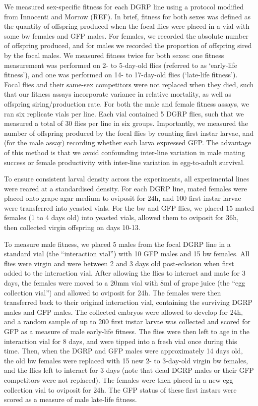 \documentclass{article}
\begin{document}
We measured sex-specific fitness for each DGRP line using a protocol
modified from Innocenti and Morrow (REF). In brief, fitness for both
sexes was defined as the quantity of offspring produced when the focal
flies were placed in a vial with some bw females and GFP males. For
females, we recorded the absolute number of offspring produced, and for
males we recorded the proportion of offspring sired by the focal males.
We measured fitness twice for both sexes: one fitness measurement was
performed on 2- to 5-day-old flies (referred to as `early-life
fitness'), and one was performed on 14- to 17-day-old flies (`late-life
fitness'). Focal flies and their same-sex competitors were not replaced
when they died, such that our fitness assays incorporate variance in
relative mortality, as well as offspring siring/production rate. For
both the male and female fitness assays, we ran six replicate vials per
line. Each vial contained 5 DGRP flies, such that we measured a total of
30 flies per line in six groups. Importantly, we measured the number of
offspring produced by the focal flies by counting first instar larvae,
and (for the male assay) recording whether each larva expressed GFP. The
advantage of this method is that we avoid confounding inter-line
variation in male mating success or female productivity with inter-line
variation in egg-to-adult survival.

To ensure consistent larval density across the experiments, all
experimental lines were reared at a standardised density. For each DGRP
line, mated females were placed onto grape-agar medium to oviposit for
24h, and 100 first instar larvae were transferred into yeasted vials.
For the bw and GFP flies, we placed 15 mated females (1 to 4 days old)
into yeasted vials, allowed them to oviposit for 36h, then collected
virgin offspring on days 10-13.

To measure male fitness, we placed 5 males from the focal DGRP line in a
standard vial (the ``interaction vial'') with 10 GFP males and 15 bw
females. All flies were virgin and were between 2 and 3 days old
post-eclosion when first added to the interaction vial. After allowing
the flies to interact and mate for 3 days, the females were moved to a
20mm vial with 8ml of grape juice (the ``egg collection vial'') and
allowed to oviposit for 24h. The females were then transferred back to
their original interaction vial, containing the surviving DGRP males and
GFP males. The collected embryos were allowed to develop for 24h, and a
random sample of up to 200 first instar larvae was collected and scored
for GFP as a measure of male early-life fitness. The flies were then
left to age in the interaction vial for 8 days, and were tipped into a
fresh vial once during this time. Then, when the DGRP and GFP males were
approximately 14 days old, the old bw females were replaced with 15 new
2- to 3-day-old virgin bw females, and the flies left to interact for 3
days (note that dead DGRP males or their GFP competitors were not
replaced). The females were then placed in a new egg collection vial to
oviposit for 24h. The GFP status of these first instars were scored as a
measure of male late-life fitness.
\end{document}
